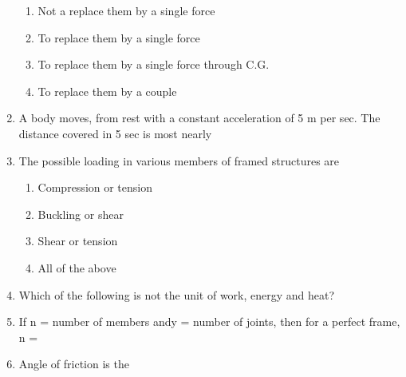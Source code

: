 \documentclass[11pt,a4paper]{article}
\begin{document}
\begin{enumerate}
\begin{enumerate}[label=\Alph*.]
\item{Not a replace them by a single force}
\item{To replace them by a single force}
\item{To replace them by a single force through C.G.}
\item{To replace them by a couple}
\end{enumerate}
\item{A body moves, from rest with a constant acceleration of 5 m per sec. The distance covered in 5 sec is most nearly}
\\
\item{The possible loading in various members of framed structures are}
\begin{enumerate}[label=\Alph*.]
\item{Compression or tension}
\item{Buckling or shear}
\item{Shear or tension}
\item{All of the above}
\end{enumerate}
\item{Which of the following is not the unit of work, energy and heat?}
\\
\item{If n = number of members andy = number of joints, then for a perfect frame, n =}
\\
\item{Angle of friction is the}

\end{enumerate}
\end{document}
